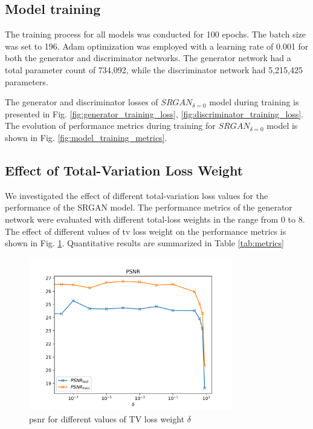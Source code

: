 \documentclass[conference]{IEEEtran}
\begin{document}
\subsection{Model training}

The training process for all models was conducted for 100 epochs. The batch size was set to 196. Adam optimization was employed with a learning rate of 0.001 for both the generator and discriminator networks. The generator network had a total parameter count of 734,092, while the discriminator network had 5,215,425 parameters.

The generator and discriminator losses of $SRGAN_{\delta=0}$ model during training is presented in Fig. \ref{fig:generator_training_loss}, \ref{fig:discriminator_training_loss}. The evolution of performance metrics during training for $SRGAN_{\delta=0}$ model is shown in Fig. \ref{fig:model_training_metrics}.

\subsection{Effect of Total-Variation Loss Weight\label{sec:effect_of_tv_weight}}

We investigated the effect of different total-variation loss values for the performance of the SRGAN model. The performance metrics of the generator network were evaluated with different total-loss weights in the range from 0 to 8. The effect of different values of \acrlong{tv} loss weight on the performance metrics is shown in Fig. \ref{fig:tv_metrics}. Quantitative results are summarized in Table \ref{tab:metrics}

\begin{figure}[htb]
	\centering
    \centerline{\includegraphics[width=8.9cm]{results/tv_psnr}}
	\caption{\acrshort{psnr} for different values of TV loss weight $\delta$}
	\label{fig:tv_metrics}
\end{figure}
\end{document}
